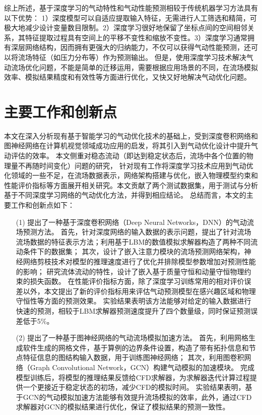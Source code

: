 综上所述，基于深度学习的气动特性和气动性能预测相较于传统机器学习方法具有以下优势：
1）深度模型可以自适应提取输入特征，无需进行人工筛选和精简，可极大地减少设计变量数目限制。2）深度学习很好地保留了坐标点间的空间相邻关系，其特征提取过程具有空间上的平移不变性和缩放不变性。3）深度学习通常拥有深层网络结构，因而拥有更强大的归纳能力，不仅可以获得气动性能预测，还可以将流场特征（如压力分布等）作为预测输出。
但是，使用深度学习技术解决气动流场优化问题，不能是简单的迁移运用，需要根据应用场景的不同，在流场模拟效率、模拟结果精度和有效性等方面进行优化，又快又好地解决气动优化问题。

\section{主要工作和创新点}
本文在深入分析现有基于智能学习的气动优化技术的基础上，受到深度卷积网络和图神经网络在计算机视觉领域成功应用的启发，将其引入到气动优化设计中提升气动评估的效率。
本文侧重对稳态流动（即达到稳定状态后，流场中各个位置的物理量不再随时间变化）问题的研究，
针对现有工作将深度学习技术应用到气动优化领域的一些不足，在流场数据表示，网络架构搭建与优化，嵌入物理模型约束和性能评价指标等方面展开相关研究。本文贡献了两个测试数据集，用于测试与分析基于不同深度学习网络的气动优化方法，并得到相应结论。
总结而言，本文的主要工作和创新点如下：
\begin{itemize}
	\item[(1)] 提出了一种基于深度卷积网络（Deep Neural Networks，DNN）的气动流场预测方法。
	首先，针对深度网络的输入数据的表示问题，提出了针对流场流场数据的特征表示方法；利用基于LBM的数值模拟求解器构造了两种不同流动条件下的数据集；
	其次，设计了嵌入注意力模块的流场预测网络架构，神经网络剪枝技术对模型的推理速度进行了优化并排除模型参数增加对预测性能的影响；
	研究流体流动的特性，设计了嵌入基于质量守恒和动量守恒物理约束的损失函数。
	在性能评价指标方面，除了深度学习训练常用的相对评价误差以外，本文提出了新的评价指标用来评估气动预测模型在感兴趣区域和物理守恒性等方面的预测效果。
	实验结果表明该方法能够对给定的输入数据进行快速的预测，相较于LBM求解器预测速度提升了四个数量级，同时保证预测误差低于5\%。
		
	
	\item[(2)] 提出了一种基于图神经网络的气动流场模拟加速方法。
	首先，利用网格生成软件生成的网格文件，基于算例的边界条件设置，构造了带有拓扑信息和节点特征信息的图结构输入数据，用于训练图神经网络；
	其次，利用图卷积网络（Graph  Convolutional Network，GCN）构建气动模拟的加速模块。
	完成模型训练后，将模型的推理结果反馈给CFD求解器，为求解器迭代计算过程提供一个更接近于稳定状态的初场，减少CFD的模拟时间。
	实验结果表明，基于GCN的气动模拟加速方法能够有效提升流场模拟的效率，此外，通过CFD求解器对GCN的模拟结果进行优化，保证了模拟结果的预测一致性。
	
	
	
\end{itemize}

